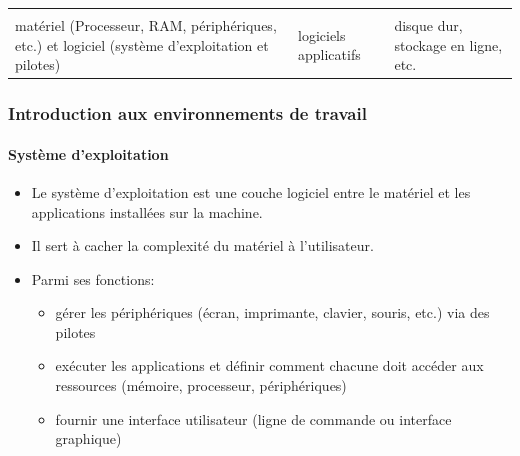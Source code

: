 \documentclass{beamer}
\begin{document}
\begin{frame}
\begin{center}
\begin{tabular}{p{}p{}p{}}
	&&\\
	
	matériel (Processeur, RAM, périphériques, etc.) et logiciel (système d'exploitation et pilotes) &
	logiciels applicatifs & 
	disque dur, stockage en ligne, etc. \\
	\end{tabular}
\end{center}

\end{frame}

%
%

\begin{frame}
\frametitle{Introduction aux environnements de travail}
\framesubtitle{Système d'exploitation}

\begin{itemize}
\item Le système d'exploitation est une couche logiciel entre le matériel et les applications installées sur la machine.

\item Il sert à cacher la complexité du matériel à l'utilisateur.

\item Parmi ses fonctions: 
\begin{itemize}
	\item gérer les périphériques (écran, imprimante, clavier, souris, etc.) via des pilotes
	\item exécuter les applications et définir comment chacune doit accéder aux ressources (mémoire, processeur, périphériques)
	\item fournir une interface utilisateur (ligne de commande ou interface graphique)
\end{itemize}
\end{itemize}

\end{frame}
\end{document}
